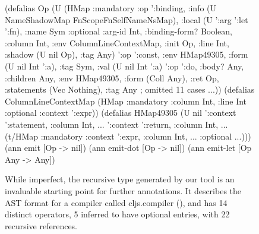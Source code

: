 \begin{figure}
\begin{cljlistingnumbered}
  (defalias Op
    (U (HMap :mandatory
             {:op ':binding,
              :info (U NameShadowMap
                       FnScopeFnSelfNameNsMap),
              :local (U ':arg ':let ':fn),
              :name Sym}
             :optional
             {:arg-id Int,
              :binding-form? Boolean,
              :column Int,
              :env ColumnLineContextMap,
              :init Op,
              :line Int,
              :shadow (U nil Op),
              :tag Any})
      '{:op ':const,
        :env HMap49305,
        :form (U nil Int ':a),
        :tag Sym,
        :val (U nil Int ':a)}
      '{:op ':do,
        :body? Any,
        :children Any,
        :env HMap49305,
        :form (Coll Any),
        :ret Op,
        :statements (Vec Nothing),
        :tag Any}
      ; omitted 11 cases
      ...))
  (defalias ColumnLineContextMap
    (HMap :mandatory {:column Int, :line Int}
          :optional {:context ':expr}))
  (defalias HMap49305
    (U nil
       '{:context ':statement, :column Int, ...}
       '{:context ':return, :column Int, ...}
       (t/HMap :mandatory
               {:context ':expr, :column Int, ...}
               :optional {...})))
  (ann emit [Op -> nil])
  (ann emit-dot [Op -> nil])
  (ann emit-let [Op Any -> Any])
\end{cljlistingnumbered}
\caption{While imperfect, the recursive type  generated by our tool 
         is an invaluable starting
         point for further annotations.
         It describes the AST format for a compiler called cljs.compiler
         (), and
         has 14 distinct operators, 5 inferred
         to have optional entries,
         with 22 recursive references.
}
\label{infer:fig:cljs}

\end{figure}
